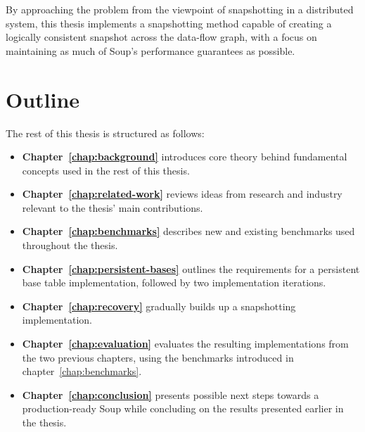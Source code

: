 By approaching the problem from the viewpoint of snapshotting in a distributed
system, this thesis implements a snapshotting method capable of creating a
logically consistent snapshot across the data-flow graph, with a focus on
maintaining as much of Soup's performance guarantees as possible.

\section{Outline}

The rest of this thesis is structured as follows:

\begin{itemize}
  \item \textbf{Chapter~\ref{chap:background}} introduces core theory behind fundamental
  concepts used in the rest of this thesis.
  \item \textbf{Chapter~\ref{chap:related-work}} reviews ideas from research and
  industry relevant to the thesis' main contributions.
  \item \textbf{Chapter~\ref{chap:benchmarks}} describes new and existing
  benchmarks used throughout the thesis.
  \item \textbf{Chapter~\ref{chap:persistent-bases}} outlines the requirements
  for a persistent base table implementation, followed by two implementation
  iterations.
  \item \textbf{Chapter~\ref{chap:recovery}} gradually builds up a snapshotting
  implementation.
  \item \textbf{Chapter~\ref{chap:evaluation}} evaluates the resulting
  implementations from the two previous chapters, using the benchmarks
  introduced in chapter~\ref{chap:benchmarks}.
  \item \textbf{Chapter~\ref{chap:conclusion}} presents possible next steps
  towards a production-ready Soup while concluding on the results presented
  earlier in the thesis.
\end{itemize}
